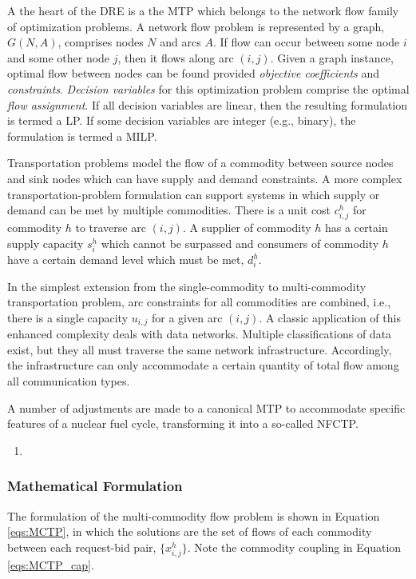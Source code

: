 A the heart of the \gls{DRE} is a the \gls{MTP} \cite{even1975complexity}
which belongs to the network flow family of optimization problems. A network
flow problem is represented by a graph, $G(N, A)$, comprises nodes $N$ and
arcs $A$. If flow can occur between some node $i$ and some other node $j$,
then it flows along arc $(i, j)$. Given a graph instance, optimal flow between
nodes can be found provided \textit{objective coefficients} and
\textit{constraints}. \textit{Decision variables} for this optimization
problem comprise the optimal \textit{flow assignment}. If all decision
variables are linear, then the resulting formulation is termed a \gls{LP}. If
some decision variables are integer (e.g., binary), the formulation is termed
a \gls{MILP}.

Transportation problems model the flow of a commodity between source nodes and
sink nodes which can have supply and demand constraints. A more complex
transportation-problem formulation can support systems in which supply or demand
can be met by multiple commodities.  There is a unit cost $c_{i,j}^{h}$ for
commodity $h$ to traverse arc $(i,j)$. A supplier of commodity $h$ has a certain
supply capacity $s_i^h$ which cannot be surpassed and consumers of commodity $h$
have a certain demand level which must be met, $d_i^h$.

In the simplest extension from the single-commodity to multi-commodity
transportation problem, arc constraints for all commodities are combined,
i.e., there is a single capacity $u_{i,j}$ for a given arc $(i, j)$. A classic
application of this enhanced complexity deals with data networks. Multiple
classifications of data exist, but they all must traverse the same network
infrastructure. Accordingly, the infrastructure can only accommodate a certain
quantity of total flow among all communication types.

A number of adjustments are made to a canonical MTP to accommodate specific
features of a nuclear fuel cycle, transforming it into a so-called
\gls{NFCTP}.

\begin{enumerate}
\item 
\end{enumerate}

\subsubsection{Mathematical Formulation}


The formulation of the multi-commodity flow problem is shown in Equation
\ref{eqs:MCTP}, in which the solutions are the set of flows of each commodity
between each request-bid pair, $\{x_{i,j}^h\}$. Note the commodity
coupling in Equation \ref{eqs:MCTP_cap}.

